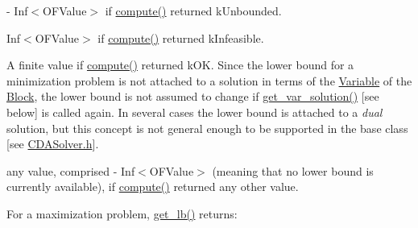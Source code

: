 \begin{DoxyItemize}
\item -\/ Inf$<$\+O\+F\+Value$>$ if \mbox{\hyperlink{class_s_m_spp__di__unipi__it_1_1_solver_a504d4e3e174c7a518cc66156a8a45ce5}{compute()}} returned k\+Unbounded.
\item Inf$<$\+O\+F\+Value$>$ if \mbox{\hyperlink{class_s_m_spp__di__unipi__it_1_1_solver_a504d4e3e174c7a518cc66156a8a45ce5}{compute()}} returned k\+Infeasible.
\item A finite value if \mbox{\hyperlink{class_s_m_spp__di__unipi__it_1_1_solver_a504d4e3e174c7a518cc66156a8a45ce5}{compute()}} returned k\+OK. Since the lower bound for a minimization problem is not attached to a solution in terms of the \mbox{\hyperlink{class_s_m_spp__di__unipi__it_1_1_variable}{Variable}} of the \mbox{\hyperlink{class_s_m_spp__di__unipi__it_1_1_block}{Block}}, the lower bound is not assumed to change if \mbox{\hyperlink{class_s_m_spp__di__unipi__it_1_1_solver_a91d7cd0dc4fa453406ef30db2bfa37a5}{get\+\_\+var\+\_\+solution()}} \mbox{[}see below\mbox{]} is called again. In several cases the lower bound is attached to a {\itshape dual} solution, but this concept is not general enough to be supported in the base class \mbox{[}see \mbox{\hyperlink{_c_d_a_solver_8h}{C\+D\+A\+Solver.\+h}}\mbox{]}.
\item any value, comprised -\/ Inf$<$\+O\+F\+Value$>$ (meaning that no lower bound is currently available), if \mbox{\hyperlink{class_s_m_spp__di__unipi__it_1_1_solver_a504d4e3e174c7a518cc66156a8a45ce5}{compute()}} returned any other value.
\end{DoxyItemize}

For a maximization problem, \mbox{\hyperlink{class_s_m_spp__di__unipi__it_1_1_solver_a4a4dbe4c2416d531c4619ca94fc07d31}{get\+\_\+lb()}} returns\+:


